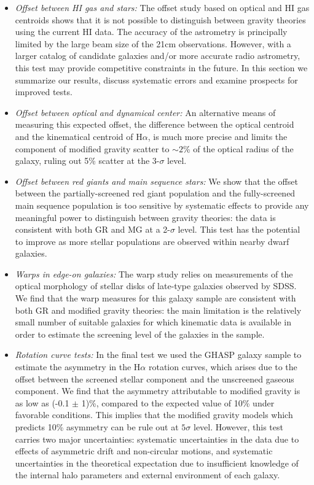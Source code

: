 \documentclass{emulateapj}
\newcommand{\ha}{H$\alpha$}
\begin{document}
\begin{itemize}
\item {\it Offset between HI gas and stars:}
The offset study based on optical and HI gas centroids shows that it is not
possible to distinguish between gravity theories using the current HI data. 
The accuracy of the astrometry is principally limited by the large beam size of
the 21cm observations.  However, with a larger catalog of candidate
galaxies and/or more accurate radio astrometry, this test may provide
competitive constraints in the future. In this section we summarize our results, 
discuss systematic errors and examine prospects for improved tests. 

\item {\it Offset between optical and dynamical center:}
An alternative means of measuring this expected offset, the difference
between the optical centroid and the kinematical centroid of \ha{}, is
much more precise and limits the component of modified gravity scatter
to  $\sim 2$\% of the optical radius of the galaxy, ruling out 5\%
scatter at the 3-$\sigma$ level.

\item {\it Offset between red giants and main sequence stars:}
We show that the offset between the partially-screened red giant
population and the fully-screened main sequence population is too
sensitive by systematic effects to provide any meaningful power to distinguish
between gravity theories: the data is consistent with both GR and MG at
a 2-$\sigma$ level.  This test has the potential to improve as more stellar
populations are observed within nearby dwarf galaxies.

\item {\it Warps in edge-on galaxies:}
The warp study relies on measurements of the optical morphology of stellar
disks of late-type galaxies observed by SDSS.
We find that the warp measures for this galaxy sample are
consistent with both GR and modified gravity theories: the main limitation
is the relatively small number of suitable galaxies for which kinematic data
is available in order to estimate the screening level of the galaxies in
the sample.   

\item {\it Rotation curve tests: }
In the final test we used the GHASP galaxy sample to estimate
the asymmetry in the \ha{} rotation curves, which arises due to the
offset between the screened stellar component and the unscreened gaseous
component. We find that the asymmetry attributable to modified gravity is as
low as (-0.1 $\pm$ 1)\%, compared to the expected value of 10\% under
favorable conditions.
This implies that the modified gravity models which predicts 10\%
asymmetry can be rule out at $5 \sigma$ level. However, this test carries two
major uncertainties: systematic uncertainties in the data due to effects of
asymmetric drift and non-circular motions, and systematic uncertainties in
the theoretical expectation due to insufficient knowledge of the internal
halo parameters and external environment of each galaxy.
\end{itemize}
\end{document}
